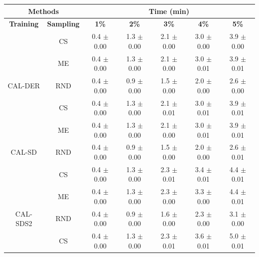 \begin{table}[htbp]
\centering

\begin{tabular*}{\linewidth}{c|c|@{\extracolsep{\fill}}ccccc}
\toprule
\multicolumn{2}{c|}{\textbf{Methods}} & \multicolumn{5}{c}{\textbf{Time (min)}} \\
\midrule
\textbf{Training} & \textbf{Sampling} & \textbf{1\%} & \textbf{2\%} & \textbf{3\%} & \textbf{4\%} & \textbf{5\%}\\
\midrule
 & CS & 0.4 $\pm$ {\small 0.00} & 1.3 $\pm$ {\small 0.00} & 2.1 $\pm$ {\small 0.00} & 3.0 $\pm$ {\small 0.00} & 3.9 $\pm$ {\small 0.00}\\

 & ME & 0.4 $\pm$ {\small 0.00} & 1.3 $\pm$ {\small 0.00} & 2.1 $\pm$ {\small 0.00} & 3.0 $\pm$ {\small 0.01} & 3.9 $\pm$ {\small 0.01}\\

\multirow{-3}{*}{\raggedright\arraybackslash CAL-DER} & RND & 0.4 $\pm$ {\small 0.00} & 0.9 $\pm$ {\small 0.00} & 1.5 $\pm$ {\small 0.00} & 2.0 $\pm$ {\small 0.00} & 2.6 $\pm$ {\small 0.00}\\
\midrule
 & CS & 0.4 $\pm$ {\small 0.00} & 1.3 $\pm$ {\small 0.00} & 2.1 $\pm$ {\small 0.01} & 3.0 $\pm$ {\small 0.01} & 3.9 $\pm$ {\small 0.01}\\

 & ME & 0.4 $\pm$ {\small 0.00} & 1.3 $\pm$ {\small 0.00} & 2.1 $\pm$ {\small 0.00} & 3.0 $\pm$ {\small 0.01} & 3.9 $\pm$ {\small 0.01}\\

\multirow{-3}{*}{\raggedright\arraybackslash CAL-SD} & RND & 0.4 $\pm$ {\small 0.00} & 0.9 $\pm$ {\small 0.00} & 1.5 $\pm$ {\small 0.00} & 2.0 $\pm$ {\small 0.00} & 2.6 $\pm$ {\small 0.01}\\
\midrule
 & CS & 0.4 $\pm$ {\small 0.00} & 1.3 $\pm$ {\small 0.00} & 2.3 $\pm$ {\small 0.01} & 3.4 $\pm$ {\small 0.01} & 4.4 $\pm$ {\small 0.01}\\

 & ME & 0.4 $\pm$ {\small 0.00} & 1.3 $\pm$ {\small 0.00} & 2.3 $\pm$ {\small 0.00} & 3.3 $\pm$ {\small 0.00} & 4.4 $\pm$ {\small 0.01}\\

\multirow{-3}{*}{\raggedright\arraybackslash CAL-SDS2} & RND & 0.4 $\pm$ {\small 0.00} & 0.9 $\pm$ {\small 0.00} & 1.6 $\pm$ {\small 0.00} & 2.3 $\pm$ {\small 0.00} & 3.1 $\pm$ {\small 0.00}\\
\midrule
 & CS & 0.4 $\pm$ {\small 0.00} & 1.3 $\pm$ {\small 0.00} & 2.3 $\pm$ {\small 0.01} & 3.6 $\pm$ {\small 0.01} & 5.0 $\pm$ {\small 0.01}\\


\end{tabular*}
\end{table}
